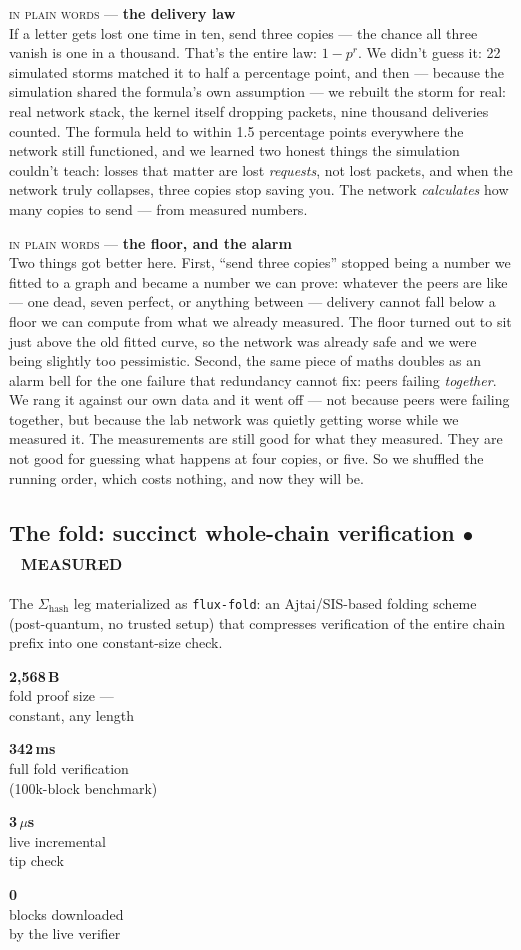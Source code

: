 \documentclass[10pt,a4paper]{article}
\newcommand{\stM}{\textcolor{sigilcyan}{$\bullet$}~{\scriptsize\textcolor{sigilcyan}{\textsc{measured}}}}
\newcommand{\layman}[3]{%
\begin{tcolorbox}[enhanced,
  interior style={left color=#1!9,right color=white},
  colframe=#1!45!slate,boxrule=0.5pt,arc=3pt,
  borderline west={2.5pt}{0pt}{#1},
  left=9pt,right=9pt,top=7pt,bottom=7pt]
{\scriptsize\textcolor{#1}{\textsc{in plain words}}\; — \;\textbf{\small #2}}\\[3pt]
\small #3
\end{tcolorbox}}
\newcommand{\metriccard}[2]{%
\begin{minipage}[t]{0.232\textwidth}
\begin{tcolorbox}[colback=panelbg,colframe=slate,boxrule=0.5pt,arc=2pt,
                  left=3pt,right=3pt,top=7pt,bottom=7pt,halign=center]
{\LARGE\bfseries\textcolor{sigilcyan}{#1}}\\[3pt]{\scriptsize #2}
\end{tcolorbox}
\end{minipage}}
\begin{document}
\layman{sigilcyan}{the delivery law}{If a letter gets lost one time in ten, send three
copies — the chance all three vanish is one in a thousand. That's the entire law:
$1-p^r$. We didn't guess it: 22 simulated storms matched it to half a percentage
point, and then — because the simulation shared the formula's own assumption — we
rebuilt the storm for real: real network stack, the kernel itself dropping packets,
nine thousand deliveries counted. The formula held to within 1.5 percentage points
everywhere the network still functioned, and we learned two honest things the
simulation couldn't teach: losses that matter are lost \emph{requests}, not lost
packets, and when the network truly collapses, three copies stop saving you. The
network \emph{calculates} how many copies to send — from measured numbers.}

\layman{sigilamber}{the floor, and the alarm}{Two things got better here. First, ``send
three copies'' stopped being a number we fitted to a graph and became a number we can
prove: whatever the peers are like --- one dead, seven perfect, or anything between ---
delivery cannot fall below a floor we can compute from what we already measured. The floor
turned out to sit just above the old fitted curve, so the network was already safe and we
were being slightly too pessimistic. Second, the same piece of maths doubles as an alarm
bell for the one failure that redundancy cannot fix: peers failing \emph{together}. We
rang it against our own data and it went off --- not because peers were failing together,
but because the lab network was quietly getting worse while we measured it. The
measurements are still good for what they measured. They are not good for guessing what
happens at four copies, or five. So we shuffled the running order, which costs nothing,
and now they will be.}

\subsection{The fold: succinct whole-chain verification \hfill \stM}\label{sec:fold}

The $\Sigma_{\mathrm{hash}}$ leg materialized as \texttt{flux-fold}: an Ajtai/SIS-based
folding scheme (post-quantum, no trusted setup) that compresses verification of the
entire chain prefix into one constant-size check.

\vspace{4pt}
\noindent
\metriccard{2{,}568\,B}{fold proof size —\\constant, any length}\hfill
\metriccard{342\,ms}{full fold verification\\(100k-block benchmark)}\hfill
\metriccard{3\,$\mu$s}{live incremental\\tip check}\hfill
\metriccard{0}{blocks downloaded\\by the live verifier}
\end{document}
